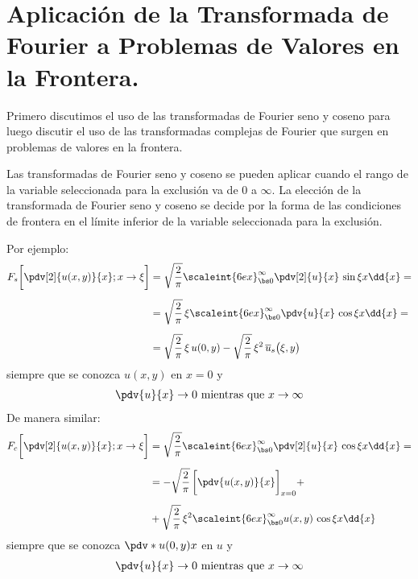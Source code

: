 \section{Aplicación de la Transformada de Fourier a Problemas de Valores en la Frontera.}

Primero discutimos el uso de las transformadas de Fourier seno y coseno para luego discutir el uso de las transformadas complejas de Fourier que surgen en problemas de valores en la frontera.
\par
Las transformadas de Fourier seno y coseno se pueden aplicar cuando el rango de la variable seleccionada para la exclusión va de $0$ a $\infty$. La elección de la transformada de Fourier seno y coseno se decide por la forma de las condiciones de frontera en el límite inferior de la variable seleccionada para la exclusión.
\par
Por ejemplo:
\begin{align}
\begin{aligned}[b]
F_{s} \bigg[ \pdv[2]{u(x, y)}{x}; x \to \xi \bigg] &= \sqrt{\dfrac{2}{\pi}} \scaleint{6ex}_{\bs 0}^{\infty} \pdv[2]{u}{x} \, \sin \xi x \dd{x} = \\[0.5em]
&= \sqrt{\dfrac{2}{\pi}} \, \xi \scaleint{6ex}_{\bs 0}^{\infty} \pdv{u}{x} \, \cos \xi x \dd{x} = \\[0.5em]
&= \sqrt{\dfrac{2}{\pi}} \, \xi \, u(0, y) - \sqrt{\dfrac{2}{\pi}} \, \xi^{2} \, \overline{u}_{s} \big( \xi, y  \big)
\end{aligned}
\label{eq:ecuacion_01_66}
\end{align}
siempre que se conozca $u (x, y)$ en $x = 0$ y
\begin{align*}
\pdv{u}{x} \to 0 \mbox{ mientras que } x \to \infty
\end{align*}
De manera similar:
\begin{align}
\begin{aligned}[b]
F_{c} \bigg[ \pdv[2]{u(x, y)}{x}; x \to \xi \bigg] &= \sqrt{\dfrac{2}{\pi}} \scaleint{6ex}_{\bs 0}^{\infty} \pdv[2]{u}{x} \, \cos \xi x \dd{x} = \\[0.5em]
&= - \sqrt{\dfrac{2}{\pi}} \, \bigg[ \pdv{u(x,y)}{x} \bigg]_{x=0} + \\[0.5em]
&+ \sqrt{\dfrac{2}{\pi}} \, \xi^{2} \scaleint{6ex}_{\bs 0}^{\infty} u (x, y) \, \cos \xi x \dd{x}
\end{aligned}
\label{eq:ecuacion_01_67}
\end{align}
siempre que se conozca $\pdv*{u (0, y)}{x}$ en $u$ y
\begin{align*}
\pdv{u}{x} \to 0 \mbox{ mientras que } x \to \infty
\end{align*}

